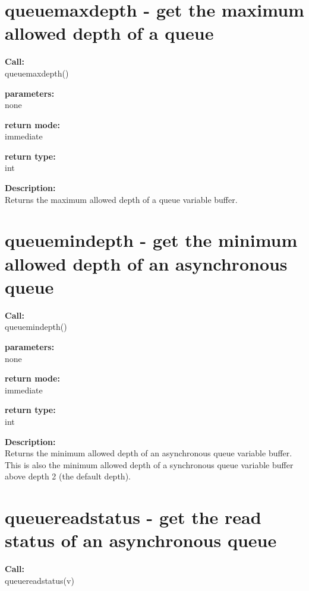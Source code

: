     \section{queuemaxdepth - get the maximum allowed depth of a queue}\label{sec:ifqueuemaxdepth}
        
        {\bf Call:} \\
        queuemaxdepth()
        
        {\bf parameters:} \\
        none
        
        {\bf return mode:} \\
        immediate

        {\bf return type:} \\
        int
        
        {\bf Description:} \\
        Returns the maximum allowed depth of a queue variable buffer.
 

    \section{queuemindepth - get the minimum allowed depth of an asynchronous queue}\label{sec:ifqueuemindepth}
        
        {\bf Call:} \\
        queuemindepth()
        
        {\bf parameters:} \\
        none
        
        {\bf return mode:} \\
        immediate

        {\bf return type:} \\
        int
        
        {\bf Description:} \\
        Returns the minimum allowed depth of an asynchronous queue variable buffer.
        This is also the minimum allowed depth of a synchronous queue variable
        buffer above depth 2 (the default depth).
  

    \section{queuereadstatus - get the read status of an asynchronous
                                                queue}\label{sec:ifqueuereadstatus}
        
        {\bf Call:} \\
        queuereadstatus(v)
        
